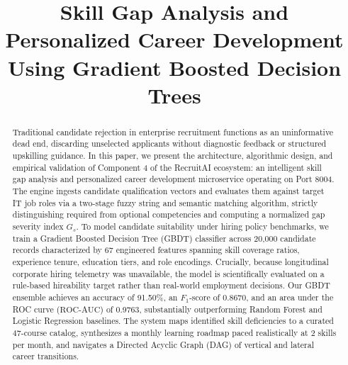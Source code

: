 \documentclass[conference]{IEEEtran}
\begin{document}
\title{Skill Gap Analysis and Personalized Career Development Using Gradient Boosted Decision Trees}

\author{
}

\maketitle

\begin{abstract}
Traditional candidate rejection in enterprise recruitment functions as an uninformative dead end, discarding unselected applicants without diagnostic feedback or structured upskilling guidance. In this paper, we present the architecture, algorithmic design, and empirical validation of Component 4 of the RecruitAI ecosystem: an intelligent skill gap analysis and personalized career development microservice operating on Port 8004. The engine ingests candidate qualification vectors and evaluates them against target IT job roles via a two-stage fuzzy string and semantic matching algorithm, strictly distinguishing required from optional competencies and computing a normalized gap severity index $G_s$. To model candidate suitability under hiring policy benchmarks, we train a Gradient Boosted Decision Tree (GBDT) classifier across 20,000 candidate records characterized by 67 engineered features spanning skill coverage ratios, experience tenure, education tiers, and role encodings. Crucially, because longitudinal corporate hiring telemetry was unavailable, the model is scientifically evaluated on a rule-based hireability target rather than real-world employment decisions. Our GBDT ensemble achieves an accuracy of 91.50\%, an $F_1$-score of 0.8670, and an area under the ROC curve ($\text{ROC-AUC}$) of 0.9763, substantially outperforming Random Forest and Logistic Regression baselines. The system maps identified skill deficiencies to a curated 47-course catalog, synthesizes a monthly learning roadmap paced realistically at 2 skills per month, and navigates a Directed Acyclic Graph (DAG) of vertical and lateral career transitions.
\end{abstract}
\end{document}
